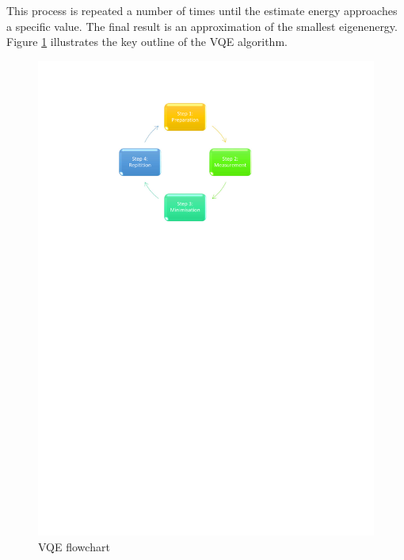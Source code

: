 \documentclass[12pt]{article}
\begin{document}
This process is repeated a number of times until the estimate energy approaches a specific value. The final result is an approximation of the smallest eigenenergy. Figure \ref{VQE} illustrates the key outline of the VQE algorithm.
\begin{figure}[H]
\begin{center}
\includegraphics[scale=1]{VQEdiagram.pdf}
\end{center}
\caption{VQE flowchart}\label{VQE}
\end{figure}
\end{document}
